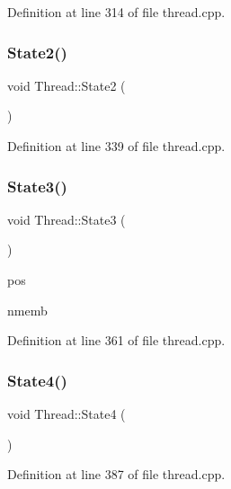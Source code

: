 Definition at line 314 of file thread.\+cpp.

\mbox{\label{class_thread_aff26f1fb31bf2a610065e584338a2aa4}} 
\subsubsection{\texorpdfstring{State2()}{State2()}}
{\footnotesize\ttfamily void Thread\+::\+State2 (\begin{DoxyParamCaption}{ }\end{DoxyParamCaption})\hspace{0.3cm}{\ttfamily [private]}}



Definition at line 339 of file thread.\+cpp.

\mbox{\label{class_thread_af850fa46507b1738f624e495f1e14c1e}} 
\subsubsection{\texorpdfstring{State3()}{State3()}}
{\footnotesize\ttfamily void Thread\+::\+State3 (\begin{DoxyParamCaption}{ }\end{DoxyParamCaption})\hspace{0.3cm}{\ttfamily [private]}}

pos

nmemb 

Definition at line 361 of file thread.\+cpp.

\mbox{\label{class_thread_acf42fbee7bf6fea082344560ab6044f0}} 
\subsubsection{\texorpdfstring{State4()}{State4()}}
{\footnotesize\ttfamily void Thread\+::\+State4 (\begin{DoxyParamCaption}{ }\end{DoxyParamCaption})\hspace{0.3cm}{\ttfamily [private]}}



Definition at line 387 of file thread.\+cpp.

